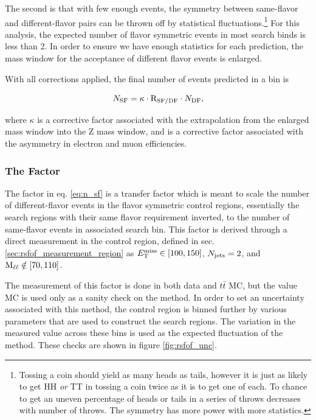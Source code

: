     The second is that with few enough events, the symmetry between same-flavor and different-flavor pairs can be thrown off by statistical fluctuations.\footnote{Tossing a coin should yield as many heads as tails, however it is just as likely to get HH \emph{or} TT in tossing a coin twice as it is to get one of each. To chance to get an uneven percentage of heads or tails in a series of throws decreases with number of throws. The symmetry has more power with more statistics.} For this analysis, the expected number of flavor symmetric events in most search binds is less than 2. In order to ensure we have enough statistics for each prediction, the mass window for the acceptance of different flavor events is enlarged.

    With all corrections applied, the final number of events predicted in a \MET bin is 

    \begin{equation}
      N_{\text{SF}} = \kappa \cdot \mathrm{R_{SF/DF}} \cdot N_{\text{DF}}, \label{eq:n_sf}
    \end{equation}

    where $\kappa$ is a corrective factor associated with the extrapolation from the enlarged mass window into the Z mass window, and \rsfof is a corrective factor associated with the asymmetry in electron and muon efficiencies.

    \subsubsection{The \rsfof Factor} \label{sec:rsfof}

      The factor \rsfof in eq. \ref{eq:n_sf} is a transfer factor which is meant to scale the number of different-flavor events in the flavor symmetric control regions, essentially the search regions with their same flavor requirement inverted, to the number of same-flavor events in associated search bin. This factor is derived through a direct measurement in the \rsfof control region, defined in sec. \ref{sec:rsfof_measurement_region} as $E_{\mathrm{T}}^{\text{miss}} \in [100,150]$, $N_{\mathrm{jets}} = 2$, and $\text{M}_{\ell\ell} \notin [70,110]$. 

      The measurement of this factor is done in both data and $t\bar{t}$ MC, but the value MC is used only as a sanity check on the method. In order to set an uncertainty associated with this method, the \rsfof control region is binned further by various parameters that are used to construct the search regions. The variation in the measured value across these bins is used as the expected fluctuation of the method. These checks are shown in figure \ref{fig:rsfof_unc}.

